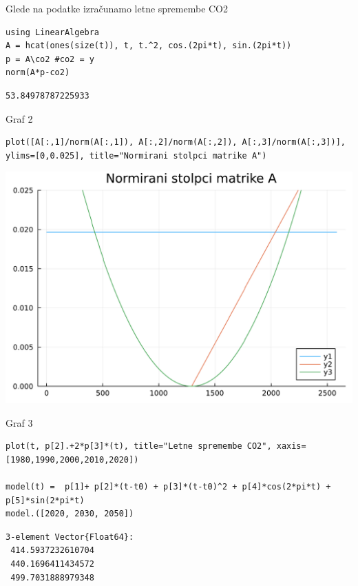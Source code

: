 \documentclass[12pt,a4paper]{article}
\begin{document}
Glede na podatke izračunamo letne spremembe CO2


\begin{verbatim}
using LinearAlgebra
A = hcat(ones(size(t)), t, t.^2, cos.(2pi*t), sin.(2pi*t))
p = A\co2 #co2 = y
norm(A*p-co2)
\end{verbatim}
\begin{verbatim}
53.84978787225933
\end{verbatim}

Graf 2


\begin{verbatim}
plot([A[:,1]/norm(A[:,1]), A[:,2]/norm(A[:,2]), A[:,3]/norm(A[:,3])], ylims=[0,0.025], title="Normirani stolpci matrike A")
\end{verbatim}
\includegraphics[width=\linewidth]{jl_AuRI8c/demo_4_1.pdf}

Graf 3


\begin{verbatim}
plot(t, p[2].+2*p[3]*(t), title="Letne spremembe CO2", xaxis=[1980,1990,2000,2010,2020])

model(t) =  p[1]+ p[2]*(t-t0) + p[3]*(t-t0)^2 + p[4]*cos(2*pi*t) + p[5]*sin(2*pi*t)
model.([2020, 2030, 2050])
\end{verbatim}
\begin{verbatim}
3-element Vector{Float64}:
 414.5937232610704
 440.1696411434572
 499.7031888979348
\end{verbatim}
\end{document}
